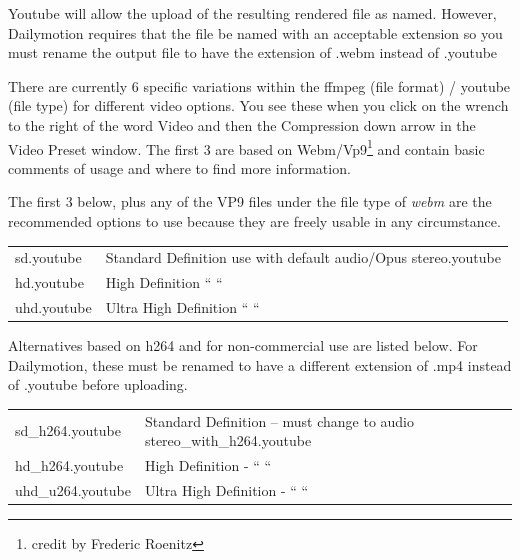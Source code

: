 Youtube will allow the upload of the resulting rendered file as named.  However, Dailymotion requires that the file be named with an acceptable extension so you must rename the output file to have the extension of .webm instead of .youtube

There are currently 6 specific variations within the ffmpeg (file format) / youtube (file type) for different video options.  You see these when you click on the wrench to the right of the word Video and then the Compression down arrow in the Video Preset window.  The first 3 are based on Webm/Vp9\protect\footnote{credit by Frederic Roenitz} and contain basic comments of usage and where to find more information.

The first 3 below, plus any of the VP9 files under the file type of \textit{webm} are the recommended options to use because they are freely usable in any circumstance.

\begin{center}
	\begin{tabular}{l p{8cm}}
		sd.youtube & Standard Definition use with default audio/Opus stereo.youtube \\
		hd.youtube & High Definition “ “ \\
		uhd.youtube & Ultra High Definition “ “ \\
	\end{tabular}
\end{center}

Alternatives based on h264 and for non-commercial use are listed below.  For Dailymotion, these must be renamed to have a different extension of .mp4 instead of .youtube before uploading.

\begin{center}
	\begin{tabular}{l p{8cm}}
		sd\_h264.youtube & Standard Definition – must change to audio stereo\_with\_h264.youtube \\
		hd\_h264.youtube & High Definition -          “ “ \\
		uhd\_u264.youtube & Ultra High Definition - “ “ \\
	\end{tabular}
\end{center}